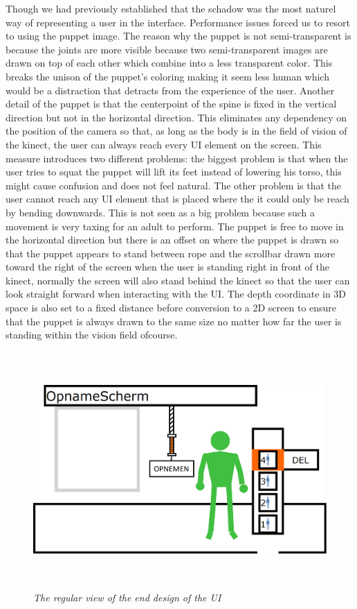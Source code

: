 Though we had previously established that the schadow was the most naturel way of representing a user in the interface. Performance issues forced us to resort to using the puppet image. The reason why the puppet is not semi-transparent is because the joints are more visible because two semi-transparent images are drawn on top of each other which combine into a less transparent color. This breaks the unison of the puppet's coloring making it seem less human which would be a distraction that detracts from the experience of the user. Another detail of the puppet is that the centerpoint of the spine is fixed in the vertical direction but not in the horizontal direction. This eliminates any dependency on the position of the camera so that, as long as the body is in the field of vision of the kinect, the user can always reach every UI element on the screen. This measure introduces two different problems: the biggest problem is that when the user tries to squat the puppet will lift its feet instead of lowering his torso, this might cause confusion and does not feel natural. The other problem is that the user cannot reach any UI element that is placed where the it could only be reach by bending downwards. This is not seen as a big problem because such a movement is very taxing for an adult to perform. The puppet is free to move in the horizontal direction but there is an offset on where the puppet is drawn so that the puppet appears to stand between rope and the scrollbar drawn more toward the right of the screen when the user is standing right in front of the kinect, normally the screen will also stand behind the kinect so that the user can look straight forward when interacting with the UI. The depth coordinate in 3D space is also set to a fixed distance before conversion to a 2D screen to ensure that the puppet is always drawn to the same size no matter how far the user is standing within the vision field ofcourse.

\begin{figure}[H]
	\begin{center}
		\includegraphics[width=16cm, height=9cm]{figures/1_screen_with_user.png}
		\caption{\emph{The regular view of the end design of the UI}}
		\label{The regular view of the end desing of the UI}
	\end{center}
\end{figure}


